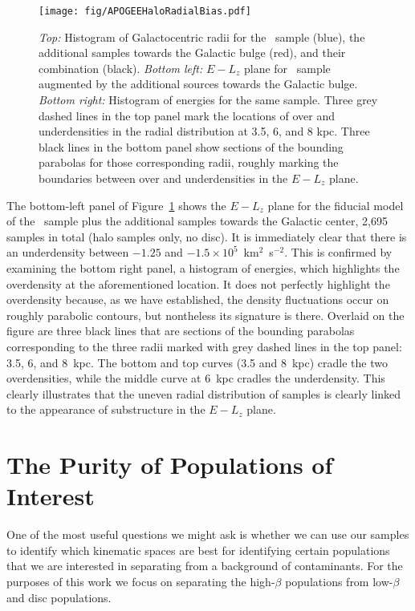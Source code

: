 \begin{figure}
    \centering
    \texttt{[image: fig/APOGEEHaloRadialBias.pdf]}
    \caption{\textit{Top:} Histogram of Galactocentric radii for the \survey\ sample (blue), the additional samples towards the Galactic bulge (red), and their combination (black). \textit{Bottom left:} $E-L_{z}$ plane for \survey\ sample augmented by the additional sources towards the Galactic bulge. \textit{Bottom right:} Histogram of energies for the same sample. Three grey dashed lines in the top panel mark the locations of over and underdensities in the radial distribution at 3.5, 6, and 8 kpc. Three black lines in the bottom panel show sections of the bounding parabolas for those corresponding radii, roughly marking the boundaries between over and underdensities in the $E-L_{z}$ plane.}
    \label{fig:APOGEERadialBias}
\end{figure}

The bottom-left panel of Figure~\ref{fig:APOGEERadialBias} shows the $E-L_{z}$ plane for the fiducial model of the \survey\ sample plus the additional samples towards the Galactic center, 2,695 samples in total (halo samples only, no disc). It is immediately clear that there is an underdensity between $-1.25$ and $-1.5\times10^{5}$~km$^{2}$~s$^{-2}$. This is confirmed by examining the bottom right panel, a histogram of energies, which highlights the overdensity at the aforementioned location. It does not perfectly highlight the overdensity because, as we have established, the density fluctuations occur on roughly parabolic contours, but nontheless its signature is there. Overlaid on the figure are three black lines that are sections of the bounding parabolas corresponding to the three radii marked with grey dashed lines in the top panel: 3.5, 6, and 8~kpc. The bottom and top curves (3.5 and 8~kpc) cradle the two overdensities, while the middle curve at 6~kpc cradles the underdensity. This clearly illustrates that the uneven radial distribution of samples is clearly linked to the appearance of substructure in the $E-L_{z}$ plane.

\section{The Purity of Populations of Interest}
\label{sec:PurityOfPopulations}

One of the most useful questions we might ask is whether we can use our samples to identify which kinematic spaces are best for identifying certain populations that we are interested in separating from a background of contaminants. For the purposes of this work we focus on separating the high-$\beta$ populations from low-$\beta$ and disc populations.

